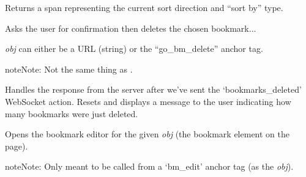 \documentclass[letterpaper,10pt,openany]{sphinxmanual}
\begin{document}

\begin{fulllineitems}
\label{Applications/terminal/plugin_bookmarks:GateOne.Bookmarks.createSortOpts}
Returns a span representing the current sort direction and ``sort by'' type.

\end{fulllineitems}


\begin{fulllineitems}
\label{Applications/terminal/plugin_bookmarks:GateOne.Bookmarks.deleteBookmark}
Asks the user for confirmation then deletes the chosen bookmark...

\emph{obj} can either be a URL (string) or the ``go\_bm\_delete'' anchor tag.

\begin{notice}{note}{Note:}
Not the same thing as {\hyperref[Applications/terminal/plugin_bookmarks:GateOne.Bookmarks.removeBookmark]{}}.
\end{notice}

\end{fulllineitems}


\begin{fulllineitems}
\label{Applications/terminal/plugin_bookmarks:GateOne.Bookmarks.deletedBookmarksSyncComplete}
Handles the response from the server after we've sent the `bookmarks\_deleted' WebSocket action.  Resets  and displays a message to the user indicating how many bookmarks were just deleted.

\end{fulllineitems}


\begin{fulllineitems}
\label{Applications/terminal/plugin_bookmarks:GateOne.Bookmarks.editBookmark}
Opens the bookmark editor for the given \emph{obj} (the bookmark element on the page).

\begin{notice}{note}{Note:}
Only meant to be called from a `bm\_edit' anchor tag (as the \emph{obj}).
\end{notice}

\end{fulllineitems}
\end{document}
